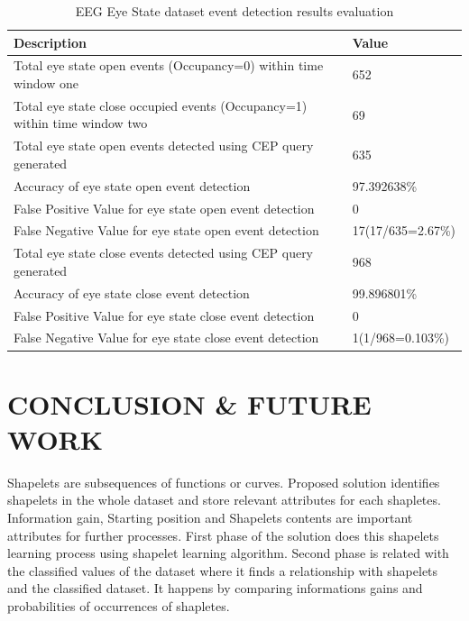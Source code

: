 \documentclass[letterpaper, 10 pt, conference]{IEEEtran}  %
\begin{document}
\begin{table}
\caption{EEG Eye State dataset event detection results evaluation}
\begin{center}
\begin{tabular}{ | m{6cm} | m{2.3cm}| } 
 \hline 
\textbf{Description} & \textbf{Value}\\
\hline
Total eye state open events (Occupancy=0) within time window one & 652\\
\hline
Total eye state close occupied events (Occupancy=1) within time window two & 69\\
\hline
Total eye state open events detected using CEP query generated & 635\\
\hline
Accuracy of eye state open event detection & 97.392638\%\\
\hline
False Positive Value for eye state open event detection & 0\\
\hline
False Negative Value for eye state open event detection & 17\newline(17/635=2.67\%)\\
\hline
Total eye state close events detected using CEP query generated & 968\\
\hline
Accuracy of eye state close event detection & 99.896801\%\\
\hline
False Positive Value for eye state close event detection & 0\\
\hline
False Negative Value for eye state close event detection & 1\newline(1/968=0.103\%)\\
\hline

\end{tabular}
\end{center}
\end{table}

\section{CONCLUSION \& FUTURE WORK}

Shapelets are subsequences of functions or curves. Proposed solution identifies shapelets in the whole dataset and store relevant attributes for each shapletes. Information gain, Starting position and Shapelets contents are important attributes for further processes. First phase of the solution does this shapelets learning process using shapelet learning algorithm. Second phase is related with the classified values of the dataset where it finds a relationship with shapelets and the classified dataset. It happens by comparing informations gains and probabilities of occurrences of shapletes. 
\end{document}

